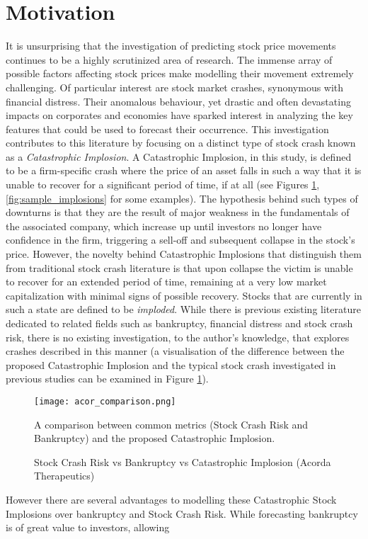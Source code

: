 \documentclass[a4paper]{report}
\begin{document}
\section{Motivation}
It is unsurprising that the investigation of predicting stock price movements continues to be a highly scrutinized area of research. The immense array of possible factors affecting
stock prices make modelling their movement extremely challenging. Of particular interest are stock market crashes, synonymous with financial distress. Their anomalous behaviour, yet drastic and often devastating impacts
on corporates and economies have sparked interest in analyzing the key features that could be used to forecast their occurrence. This investigation contributes to this literature by focusing on a distinct type of stock crash known as a \textit{Catastrophic Implosion}. A 
Catastrophic Implosion, in this study, is defined to be a firm-specific crash where the price of an asset falls in such a way that it is unable to recover for a significant period of time, if at all (see Figures \ref{fig:Catastrophic Stock Implosion vs Stock Crash}, \ref{fig:sample_implosions} for some examples).
The hypothesis behind such types of downturns is that they are the result of major weakness in the fundamentals of the associated company,
which increase up until investors no longer have confidence in the firm, triggering a sell-off and subsequent collapse in the stock's price. However, the novelty behind Catastrophic Implosions that distinguish them from traditional stock crash literature is that upon collapse the victim is unable to recover for an extended period of time, 
remaining at a very low market capitalization with minimal signs of possible recovery. Stocks that are currently in such a state are defined to be \textit{imploded}. While there is previous existing literature dedicated to related fields such as bankruptcy, financial distress and stock crash risk, 
there is no existing investigation, to the author's knowledge, that explores crashes described in this manner (a visualisation of the difference between the proposed Catastrophic Implosion and the typical stock crash investigated 
in previous studies can be examined in Figure \ref{fig:Catastrophic Stock Implosion vs Stock Crash}).\begin{figure}[htbp]
  \centering
  \texttt{[image: acor\_comparison.png]}
  \caption{Stock Crash Risk vs Bankruptcy vs Catastrophic Implosion (Acorda Therapeutics)}
  \label{fig:Catastrophic Stock Implosion vs Stock Crash}
  \medskip %
  \begin{minipage}{0.8\textwidth} %
    \small %
    A comparison between common metrics (Stock Crash Risk and Bankruptcy) and the proposed Catastrophic Implosion.
  \end{minipage}
\end{figure} However there are several advantages to modelling these Catastrophic Stock Implosions over bankruptcy and Stock Crash Risk. While forecasting bankruptcy is of great value to investors, allowing
\end{document}
